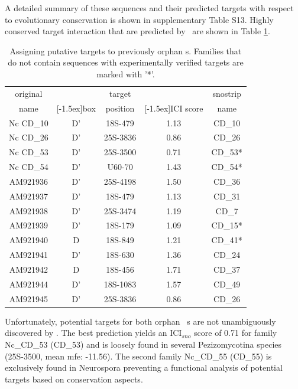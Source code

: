 A detailed summary of these sequences and their predicted targets with
respect to evolutionary conservation is shown in supplementary Table
S13. Highly conserved target interaction that are predicted by
\snostrip\ are shown in Table \ref{tab:orphan_cd_snoRNAs_short}.

\begin{table}
  \caption{Assigning putative targets to previously
    orphan \cd s. Families that do not contain sequences with
    experimentally verified targets are marked with '*'. }
  \label{tab:orphan_cd_snoRNAs_short}
  \begin{center}
    \begin{footnotesize}
      \begin{tabular}{c|c|c|c|c}
      original&&target&&snostrip\\
      name&\raisebox{1.5ex}[-1.5ex]{box}&position&\raisebox{1.5ex}[-1.5ex]{ICI
      score}&name\\
  \hline
  Nc CD\_10&D'&18S-479&1.13&CD\_10\\
\hline
  Nc CD\_26&D'&25S-3836&0.86&CD\_26\\
\hline
  Nc CD\_53&D'&25S-3500&0.71&CD\_53*\\
\hline
  Nc CD\_54&D'&U60-70&1.43&CD\_54*\\
 \hline
  AM921936&D'&25S-4198&1.50&CD\_36\\
\hline
  AM921937&D'&18S-479&1.13&CD\_31\\
\hline
  AM921938&D'&25S-3474&1.19&CD\_7\\
\hline
  AM921939&D'&18S-179&1.09&CD\_15*\\
\hline
  AM921940&D&18S-849&1.21&CD\_41*\\
\hline
  AM921941&D'&18S-630&1.36&CD\_24\\
\hline
  AM921942&D&18S-456&1.71&CD\_37\\
\hline
  AM921944&D'&18S-1083&1.57&CD\_49\\
\hline
  AM921945&D'&25S-3836&0.86&CD\_26\\

    \end{tabular}
    \end{footnotesize}
  \end{center} 
\end{table}

Unfortunately, potential targets for both orphan \ncr\ \sno s are not
unambiguously discovered by \snostrip. The best prediction yields an
ICI$_{sno}$ score of 0.71 for family Nc\_CD\_53 (CD\_53) and is
loosely found in several Pezizomycotina species (25S-3500, mean mfe:
-11.56). The second family Nc\_CD\_55 (CD\_55) is exclusively found in
Neurospora preventing a functional analysis of potential targets based
on conservation aspects.

